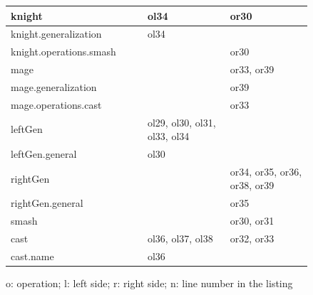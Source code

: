 \begin{table}[]
\begin{scriptsize}
\begin{tabular}{|m{0.38\linewidth}|m{0.23\linewidth}|m{0.23\linewidth}|}
        knight                             & ol34                                      & or30                                       \\ \hline
        knight.generalization              & ol34                                      &                                            \\ \hline
        knight.operations.smash            &                                           & or30                                       \\ \hline
        mage                               &                                           & or33, or39                                 \\ \hline
        mage.generalization                &                                           & or39                                       \\ \hline
        mage.operations.cast               &                                           & or33                                       \\ \hline
        leftGen                            & ol29, ol30, ol31, ol33, ol34              &                                            \\ \hline
        leftGen.general                    & ol30                                      &                                            \\ \hline
        rightGen                           &                                           & or34, or35, or36, or38, or39               \\ \hline
        rightGen.general                   &                                           & or35                                       \\ \hline
        smash                              &                                           & or30, or31                                 \\ \hline
        cast                               & ol36, ol37, ol38                          & or32, or33                                 \\ \hline
        cast.name                          & ol36                                      &                                            \\ \hline
    \end{tabular}
o: operation; l: left side; r: right side; n: line number in the listing
\end{scriptsize}
\end{table}

